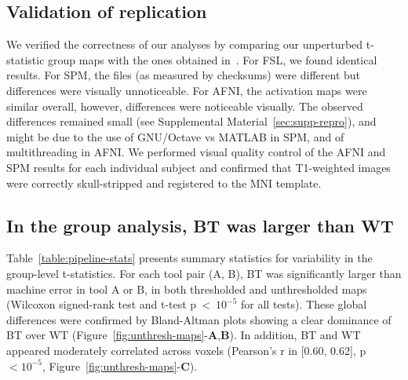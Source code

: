 \documentclass[11pt,onecolumn]{article}
\begin{document}
\subsection{Validation of replication}

We verified the correctness of our analyses by comparing our unperturbed
t-statistic group maps with the ones obtained
in~\cite{bowring2019exploring}. For FSL, we found
identical results. For SPM, the files (as measured by checksums) were different but differences
were visually unnoticeable. For AFNI, the activation maps were similar
overall, however, differences were noticeable visually.
The observed differences remained small (see Supplemental Material~\ref{sec:supp-repro}), and might be due to the use of
GNU/Octave vs MATLAB in SPM, and of multithreading in AFNI. We performed visual quality control of the AFNI
and SPM results for each individual subject and confirmed that T1-weighted images were
correctly skull-stripped and registered to the MNI template.

\subsection{In the group analysis, BT was larger than WT}

Table~\ref{table:pipeline-stats} presents summary statistics for variability in the
group-level t-statistics. For each tool pair (A, B), BT was
significantly larger than machine error in tool A or B, in both thresholded
and unthresholded maps (Wilcoxon signed-rank test and t-test p~\textless~$10^{-5}$ for all tests).
These global differences were confirmed by Bland-Altman plots showing a
clear dominance of BT over WT
(Figure~\ref{fig:unthresh-maps}-\textbf{A},\textbf{B}).
In addition, BT and WT appeared moderately correlated across voxels (Pearson's r
in [0.60, 0.62], p$< 10^{-5}$, Figure~\ref{fig:unthresh-maps}-\textbf{C}). 
\end{document}
